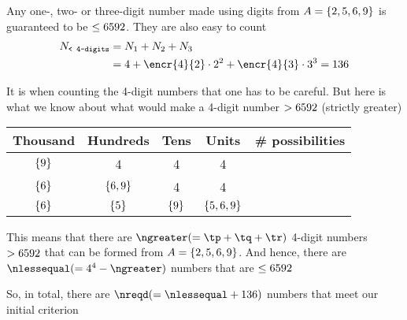 \begin{solution} 
	Any one-, two- or three-digit number made using digits from $A=\lbrace 2,5,6,9 \rbrace$ 
	is guaranteed to be $\leq 6592$. They are also easy to count
	\begin{align}
		N_{\texttt{< 4-digits}} &= N_1 + N_2 + N_3 \\ 
		 &= 4 + \encr{4}{2}\cdot 2^2 + \encr{4}{3}\cdot 3^3 = 136
	\end{align}
	
	It is when counting the 4-digit numbers that one has to be careful. But here is what we know about what 
	would make a 4-digit number $ > 6592$ (strictly greater)
	
	
	\begin{tabular}{ccccc}
		\toprule
		Thousand & Hundreds & Tens & Units & \# possibilities \\
		\midrule
		$\lbrace9\rbrace$ & 4 & 4 & 4 & \tp \\ %
		$\lbrace6\rbrace$ & $\lbrace6,9\rbrace$ & 4 & 4 & \tq \\ %
		$\lbrace6\rbrace$ & $\lbrace5\rbrace$ & $\lbrace9\rbrace$ & $\lbrace5,6,9\rbrace$ & \tr \\ %
	    \bottomrule
	\end{tabular}
	
	This means that there are $\ngreater (= \tp + \tq + \tr)$ 4-digit numbers $ > 6592$ that can be formed from 
	$A = \lbrace2,5,6,9\rbrace$. And hence, there are $\nlessequal( = 4^4 - \ngreater)$ numbers that are $ \leq 6592$
	
	So, in total, there are $\nreqd (= \nlessequal + 136)$ numbers that meet our initial criterion
	
\end{solution}
